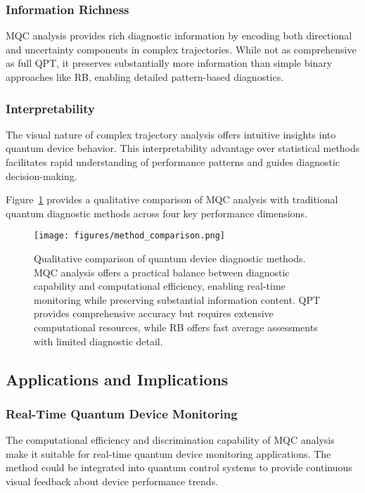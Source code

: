 \subsubsection{Information Richness}
MQC analysis provides rich diagnostic information by encoding both directional and uncertainty components in complex trajectories. While not as comprehensive as full QPT, it preserves substantially more information than simple binary approaches like RB, enabling detailed pattern-based diagnostics.

\subsubsection{Interpretability}
The visual nature of complex trajectory analysis offers intuitive insights into quantum device behavior. This interpretability advantage over statistical methods facilitates rapid understanding of performance patterns and guides diagnostic decision-making.

Figure~\ref{fig:method_comparison} provides a qualitative comparison of MQC analysis with traditional quantum diagnostic methods across four key performance dimensions.

\begin{figure}[htb]
\centering
\texttt{[image: figures/method\_comparison.png]}
\caption{Qualitative comparison of quantum device diagnostic methods. MQC analysis offers a practical balance between diagnostic capability and computational efficiency, enabling real-time monitoring while preserving substantial information content. QPT provides comprehensive accuracy but requires extensive computational resources, while RB offers fast average assessments with limited diagnostic detail.}
\label{fig:method_comparison}
\end{figure}

\subsection{Applications and Implications}

\subsubsection{Real-Time Quantum Device Monitoring}
The computational efficiency and discrimination capability of MQC analysis make it suitable for real-time quantum device monitoring applications. The method could be integrated into quantum control systems to provide continuous visual feedback about device performance trends.

